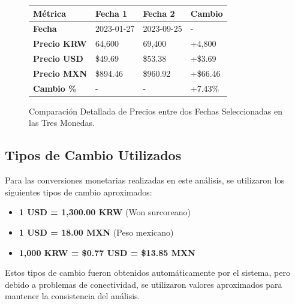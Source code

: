 \documentclass[12pt, a4paper]{article}
\begin{document}
\begin{figure}[H]
    \centering
    \begin{tabularx}{\textwidth}{@{}l l l l@{}}
        \toprule
        \textbf{Métrica} & \textbf{Fecha 1} & \textbf{Fecha 2} & \textbf{Cambio} \\
        \midrule
        \textbf{Fecha} & 2023-01-27 & 2023-09-25 & - \\
        \textbf{Precio KRW} & 64,600 & 69,400 & +4,800 \\
        \textbf{Precio USD} & \$49.69 & \$53.38 & +\$3.69 \\
        \textbf{Precio MXN} & \$894.46 & \$960.92 & +\$66.46 \\
        \textbf{Cambio \%} & - & - & +7.43\% \\
        \bottomrule
    \end{tabularx}
    \caption{Comparación Detallada de Precios entre dos Fechas Seleccionadas en las Tres Monedas.}
    \label{tab:comparacion_detallada}
\end{figure}

\subsection*{Tipos de Cambio Utilizados}
Para las conversiones monetarias realizadas en este análisis, se utilizaron los siguientes tipos de cambio aproximados:
\begin{itemize}
    \item \textbf{1 USD = 1,300.00 KRW} (Won surcoreano)
    \item \textbf{1 USD = 18.00 MXN} (Peso mexicano)
    \item \textbf{1,000 KRW = \$0.77 USD = \$13.85 MXN}
\end{itemize}

Estos tipos de cambio fueron obtenidos automáticamente por el sistema, pero debido a problemas de conectividad, se utilizaron valores aproximados para mantener la consistencia del análisis.
\end{document}

